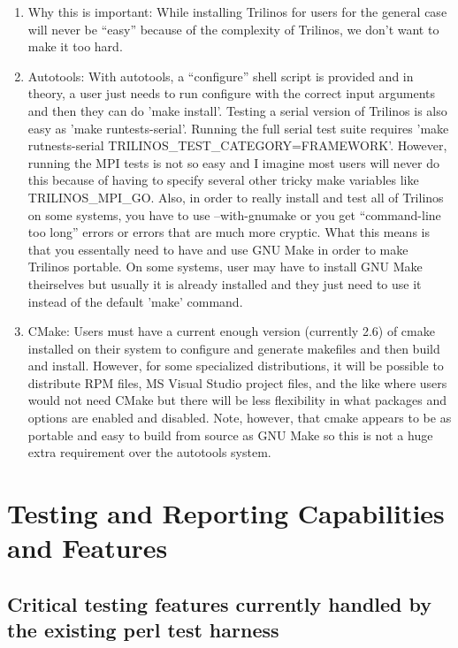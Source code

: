 \documentclass[pdf,ps2pdf,11pt]{SANDreport}
\begin{document}
\begin{enumerate}
\begin{enumerate}
  {}\item Why this is important: While installing Trilinos for users
  for the general case will never be ``easy'' because of the
  complexity of Trilinos, we don't want to make it too hard.

  {}\item Autotools: With autotools, a ``configure'' shell script is
  provided and in theory, a user just needs to run configure with the
  correct input arguments and then they can do 'make install'.
  Testing a serial version of Trilinos is also easy as 'make
  runtests-serial'.  Running the full serial test suite requires 'make
  rutnests-serial TRILINOS\_TEST\_CATEGORY=FRAMEWORK'.  However,
  running the MPI tests is not so easy and I imagine most users will
  never do this because of having to specify several other tricky make
  variables like TRILINOS\_MPI\_GO.  Also, in order to really install
  and test all of Trilinos on some systems, you have to use
  --with-gnumake or you get ``command-line too long'' errors or errors
  that are much more cryptic.  What this means is that you essentally
  need to have and use GNU Make in order to make Trilinos portable.
  On some systems, user may have to install GNU Make theirselves but
  usually it is already installed and they just need to use it instead
  of the default 'make' command.

  {}\item CMake: Users must have a current enough version (currently
  2.6) of cmake installed on their system to configure and generate
  makefiles and then build and install.  However, for some specialized
  distributions, it will be possible to distribute RPM files, MS
  Visual Studio project files, and the like where users would not need
  CMake but there will be less flexibility in what packages and
  options are enabled and disabled.  Note, however, that cmake appears
  to be as portable and easy to build from source as GNU Make so this
  is not a huge extra requirement over the autotools system.

  \end{enumerate}

\end{enumerate}


%
\section{Testing and Reporting Capabilities and Features}
%


%
{}\subsection{Critical testing features currently handled by the
existing perl test harness}
%
\end{document}
